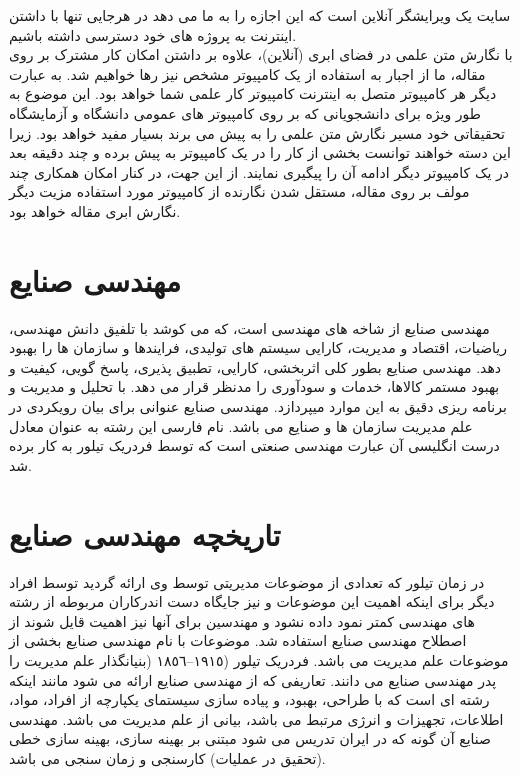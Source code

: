 \documentclass[12pt,onecolumn,a4paper]{article}
\begin{document}
سایت  یک ویرایشگر آنلاین \lr{\LaTeX{}} است که این اجازه را به ما می دهد در هرجایی تنها با داشتن اینترنت به پروژه های خود دسترسی داشته باشیم.\\
با نگارش متن علمی در فضای ابری (آنلاین)، علاوه بر داشتن امکان کار مشترک بر روی مقاله، ما از اجبار به استفاده از یک کامپیوتر مشخص نیز رها خواهیم شد. به عبارت دیگر هر کامپیوتر متصل به اینترنت کامپیوتر کار علمی شما خواهد بود. این موضوع به طور ویژه برای دانشجویانی که بر روی کامپیوتر های عمومی دانشگاه و آزمایشگاه تحقیقاتی خود مسیر نگارش متن علمی را به پیش می برند بسیار مفید خواهد بود. زیرا این دسته خواهند توانست بخشی از کار را در یک کامپیوتر به پیش برده و چند دقیقه بعد در یک کامپیوتر دیگر ادامه آن را پیگیری نمایند. از این جهت، در کنار امکان همکاری چند مولف بر روی مقاله، مستقل شدن نگارنده از کامپیوتر مورد استفاده مزیت دیگر نگارش ابری مقاله خواهد بود.\\

\section{ مهندسی صنایع}
مهندسی صنایع   از شاخه های مهندسی است، که می کوشد با تلفیق دانش مهندسی، ریاضیات، اقتصاد و
مدیریت، کارایی سیستم های تولیدی، فرایندها و سازمان ها را بهبود دهد.
مهندسی صنایع بطور کلی اثربخشی، کارایی، تطبیق پذیری، پاسخ گویی، کیفیت و بهبود مستمر کالاها، خدمات و سودآوری را مدنظر قرار می دهد. با
تحلیل و مدیریت و برنامه ریزی دقیق به این موارد میپردازد.
مهندسی صنایع عنوانی برای بیان رویکردی در علم مدیریت سازمان ها و صنایع می باشد.
نام فارسی این رشته به عنوان معادل درست انگلیسی آن عبارت مهندسی صنعتی است که توسط فردریک تیلور به کار برده شد.

\section{تاریخچه مهندسی صنایع}
در زمان تیلور که تعدادی از موضوعات مدیریتی توسط وی ارائه گردید توسط افراد دیگر برای اینکه اهمیت این موضوعات و نیز جایگاه دست اندرکاران
مربوطه از رشته های مهندسی کمتر نمود داده نشود و مهندسین برای آنها نیز اهمیت قایل شوند از اصطلاح مهندسی صنایع استفاده شد. موضوعات با
نام مهندسی صنایع بخشی از موضوعات علم مدیریت می باشد. فردریک تیلور (١٩١٥–١٨٥٦ (بنیانگذار علم مدیریت را پدر مهندسی صنایع می دانند.
تعاریفی که از مهندسی صنایع ارائه می شود مانند اینکه رشته ای است که با طراحی، بهبود، و پیاده سازی سیستمای یکپارچه از افراد، مواد، اطلاعات،
تجهیزات و انرژی مرتبط می باشد، بیانی از علم مدیریت می باشد. مهندسی صنایع آن گونه که در ایران تدریس می شود مبتنی بر بهینه سازی،
بهینه سازی خطی (تحقیق در عملیات) کارسنجی و زمان سنجی می باشد.
\end{document}

